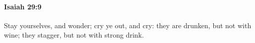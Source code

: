 
		\paragraph{Isaiah 29:9} %
			\label{ISAIAH-29-9}

			Stay yourselves, and wonder; cry ye out, and cry: they are drunken, but not with wine; they stagger, but not with strong drink.


